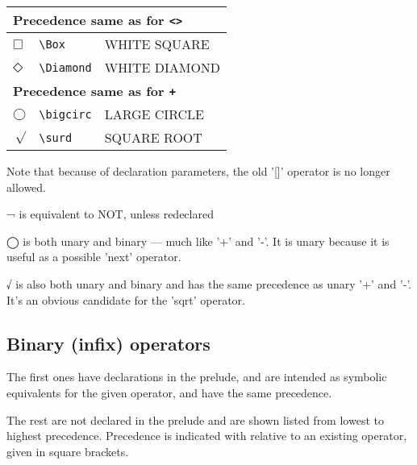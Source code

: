 \begin{center}
\smaller
{} \label{unicode:unaryops}
\begin{tabular}{|ll>{\smaller\ttfamily}l|}\hline
  \multicolumn{3}{|l|}{\bfseries Precedence same as for \texttt{<>}} \\ \hline
  $□$ & \verb|\Box| & WHITE SQUARE \\
  $◇$ & \verb|\Diamond| & WHITE DIAMOND \\ \hline
  \multicolumn{3}{|l|}{\bfseries Precedence same as for \texttt{+}} \\ \hline
  $◯$ & \verb|\bigcirc| & LARGE CIRCLE \\
  $√$ & \verb|\surd| & SQUARE ROOT \\ \hline
\end{tabular}
\end{center}

Note that because of declaration parameters, the old '[]' operator is no
longer allowed.

¬ is equivalent to NOT, unless redeclared

◯ is both unary and binary — much like '+' and '-'.  It is unary because
it is useful as a possible 'next' operator.

√ is also both unary and binary and has the same precedence
as unary '+' and '-'.  It's an obvious candidate for the 'sqrt' operator.

\subsection{Binary (infix) operators}

The first ones have declarations in the prelude, and are intended as
symbolic equivalents for the given operator, and have the same precedence.

The rest are not declared in the prelude and are shown listed from lowest
to highest precedence.  Precedence is indicated with relative to an existing
operator, given in square brackets.

